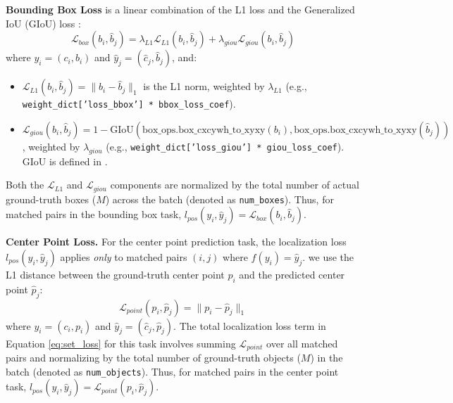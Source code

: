 \textbf{Bounding Box Loss} is a linear combination of the L1 loss and the Generalized IoU (GIoU) loss \cite{}:
\begin{equation}
    \mathcal{L}_{box}(b_i, \hat{b}_j) = \lambda_{L1} \mathcal{L}_{L1}(b_i, \hat{b}_j) + \lambda_{giou} \mathcal{L}_{giou}(b_i, \hat{b}_j)
    \label{eq:box_loss_revised}
\end{equation}
where $y_i = (c_i, b_i)$ and $\hat{y}_j = (\hat{c}_j, \hat{b}_j)$, and:
\begin{itemize}
    \item $ \mathcal{L}_{L1}(b_i, \hat{b}_j) = \|b_i - \hat{b}_j\|_1 $ is the L1 norm, weighted by $ \lambda_{L1} $ (e.g., \texttt{weight\_dict['loss\_bbox'] * bbox\_loss\_coef}).
    \item $ \mathcal{L}_{giou}(b_i, \hat{b}_j) = 1 - \text{GIoU}(\text{box\_ops.box\_cxcywh\_to\_xyxy}(b_i), \text{box\_ops.box\_cxcywh\_to\_xyxy}(\hat{b}_j)) $, weighted by $ \lambda_{giou} $ (e.g., \texttt{weight\_dict['loss\_giou'] * giou\_loss\_coef}). GIoU is defined in \cite{Rezatofighi2019GeneralizedIO}. %
\end{itemize}
Both the $ \mathcal{L}_{L1} $ and $ \mathcal{L}_{giou} $ components are normalized by the total number of actual ground-truth boxes ($M$) across the batch (denoted as \texttt{num\_boxes}). Thus, for matched pairs in the bounding box task, $l_{pos}(y_i, \hat{y}_j) = \mathcal{L}_{box}(b_i, \hat{b}_j)$.

\textbf{Center Point Loss.} For the center point prediction task, the localization loss $l_{pos}(y_i, \hat{y}_j)$ applies \textit{only} to matched pairs $(i, j)$ where $f(y_i) = \hat{y}_j$. we use the L1 distance between the ground-truth center point $p_i$ and the predicted center point $\hat{p}_j$:
\begin{equation} \label{eq:point_loss}
    \mathcal{L}_{point}(p_i, \hat{p}_j) = \|p_i - \hat{p}_j\|_1
\end{equation}
where $y_i = (c_i, p_i)$ and $\hat{y}_j = (\hat{c}_j, \hat{p}_j)$. The total localization loss term in Equation \ref{eq:set_loss} for this task involves summing $\mathcal{L}_{point}$ over all matched pairs and normalizing by the total number of ground-truth objects ($M$) in the batch (denoted as \texttt{num\_objects}). Thus, for matched pairs in the center point task, $l_{pos}(y_i, \hat{y}_j) = \mathcal{L}_{point}(p_i, \hat{p}_j)$.

